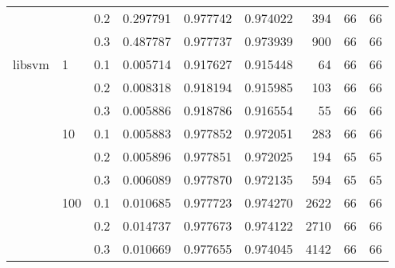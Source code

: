 \begin{table}[h!]
\begin{tabular}{lllrrrrrr}
       &     & 0.2 &  0.297791 &  0.977742 &  0.974022 &     394 &          66 &        66 \\
       &     & 0.3 &  0.487787 &  0.977737 &  0.973939 &     900 &          66 &        66 \\
libsvm & 1   & 0.1 &  0.005714 &  0.917627 &  0.915448 &      64 &          66 &        66 \\
       &     & 0.2 &  0.008318 &  0.918194 &  0.915985 &     103 &          66 &        66 \\
       &     & 0.3 &  0.005886 &  0.918786 &  0.916554 &      55 &          66 &        66 \\
       & 10  & 0.1 &  0.005883 &  0.977852 &  0.972051 &     283 &          66 &        66 \\
       &     & 0.2 &  0.005896 &  0.977851 &  0.972025 &     194 &          65 &        65 \\
       &     & 0.3 &  0.006089 &  0.977870 &  0.972135 &     594 &          65 &        65 \\
       & 100 & 0.1 &  0.010685 &  0.977723 &  0.974270 &    2622 &          66 &        66 \\
       &     & 0.2 &  0.014737 &  0.977673 &  0.974122 &    2710 &          66 &        66 \\
       &     & 0.3 &  0.010669 &  0.977655 &  0.974045 &    4142 &          66 &        66 \\
\bottomrule
\end{tabular}
\end{table}
